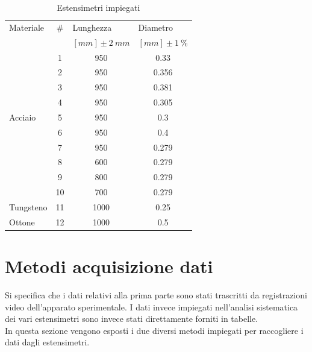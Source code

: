 \documentclass[a4paper,11pt,oneside]{article}
\begin{document}
\begin{table}
	\centering
	\begin{tabular}{lccc}
		    Materiale & \#& \multicolumn{1}{l}{Lunghezza}        & \multicolumn{1}{l}{Diametro}\\ 
		    &&$[\si{mm}] \pm\SI{2}{mm}$&$[\si{mm}] \pm\SI{1}{\percent}$\\
		\hline
\multirow{9}{*}{Acciaio} & {\cellcolor[rgb]{0.753,0.753,0.753}}1  & {\cellcolor[rgb]{0.753,0.753,0.753}}950  & {\cellcolor[rgb]{0.753,0.753,0.753}}0.33   \\
& 2 & 950 & 0.356  \\
& {\cellcolor[rgb]{0.753,0.753,0.753}}3  & {\cellcolor[rgb]{0.753,0.753,0.753}}950  & {\cellcolor[rgb]{0.753,0.753,0.753}}0.381  \\
& 4 & 950 & 0.305  \\ & {\cellcolor[rgb]{0.753,0.753,0.753}}5  & {\cellcolor[rgb]{0.753,0.753,0.753}}950  & {\cellcolor[rgb]{0.753,0.753,0.753}}0.3    \\
& 6 & 950 & 0.4                                        \\
& {\cellcolor[rgb]{0.753,0.753,0.753}}7  & {\cellcolor[rgb]{0.753,0.753,0.753}}950  & {\cellcolor[rgb]{0.753,0.753,0.753}}0.279  \\
& 8 & 600 & 0.279                                      \\
& {\cellcolor[rgb]{0.753,0.753,0.753}}9  & {\cellcolor[rgb]{0.753,0.753,0.753}}800  & {\cellcolor[rgb]{0.753,0.753,0.753}}0.279  \\
& 10 & 700 & 0.279                                      \\

Tungsteno & {\cellcolor[rgb]{0.753,0.753,0.753}}11 &{\cellcolor[rgb]{0.753,0.753,0.753}} 1000 &{\cellcolor[rgb]{0.753,0.753,0.753}} 0.25\\
Ottone                   & 12 & 1000 & 0.5   
\end{tabular}
	\caption{Estensimetri impiegati}
	\label{tab:caratteristiche_estensimetri}
\end{table}



\section{Metodi acquisizione dati}
Si specifica che i dati relativi alla prima parte sono stati trascritti da registrazioni video dell'apparato sperimentale. I dati invece impiegati nell'analisi sistematica dei vari estensimetri sono invece stati direttamente forniti in tabelle.\\
In questa sezione vengono esposti i due diversi metodi impiegati per raccogliere i dati dagli estensimetri.
\end{document}
